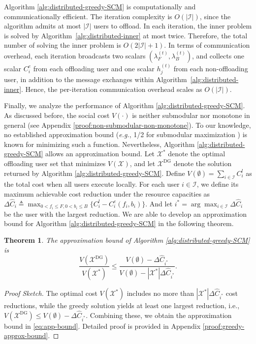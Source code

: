 \documentclass[lettersize,journal]{IEEEtran}
\newtheorem{theorem}{Theorem}
\newcommand{\eg}{\emph{e.g.}}
\begin{document}
Algorithm \ref{alg:distributed-greedy-SCM} is computationally and communicationally efficient. The iteration complexity is $O(|\mathcal{I}|)$, since the algorithm admits at most $|\mathcal{I}|$ users to offload. 
In each iteration, the inner problem is solved by Algorithm~\ref{alg:distributed-inner} at most twice. Therefore, the total number of solving the inner problem is $O(2|\mathcal{I|}+1)$.
In terms of communication overhead, each iteration broadcasts two scalars $(\lambda_F^{(t)},\lambda_B^{(t)})$, and collects one scalar $C^e_i$ from each offloading user and one scalar $h_j^{(t)}$ from each non-offloading user, in addition to the message exchanges within Algorithm~\ref{alg:distributed-inner}. Hence, the per-iteration communication overhead scales as $O(|\mathcal{I}|)$.

Finally, we analyze the performance of Algorithm \ref{alg:distributed-greedy-SCM}. As discussed before, the social cost $V(\cdot)$ is neither submodular nor monotone in general (see Appendix \ref{proof:non-submodular-non-monotone}). To our knowledge, no established approximation bound (\eg, 1/2 for submodular maximization \cite{buchbinder2018deterministic}) is known for minimizing such a function. Nevertheless, Algorithm \ref{alg:distributed-greedy-SCM} allows an approximation bound.
Let \( \mathcal{X}^* \) denote the optimal offloading user set that minimizes \( V(\mathcal{X}) \), and let \( \mathcal{X}^{\mathrm{DG}} \) denote the solution returned by Algorithm \ref{alg:distributed-greedy-SCM}. Define \( V(\emptyset) = \sum_{i \in \mathcal{I}} C_i^l \) as the total cost when all users execute locally.  
For each user \( i \in \mathcal{I} \), we define its maximum achievable cost reduction under the resource capacities as $\Delta\hat{C}_i\triangleq\max_{0<f_i\le F,0<b_i\le B}\{C^l_i-C^e_i(f_i,b_i)\}$. And let \( i^* = \arg\max_{i \in \mathcal{I}} \Delta \hat{C}_i \) be the user with the largest reduction. We are able to develop an approximation bound for Algorithm \ref{alg:distributed-greedy-SCM} in the following theorem.

\begin{theorem}\label{theorem:approx-bound}
    The approximation bound of Algorithm \ref{alg:distributed-greedy-SCM} is 
    \begin{equation}\label{eq:app-bound}
                \frac{V(\mathcal{X}^{\mathrm{DG}})}{V(\mathcal{X}^*)} \le \frac{V(\emptyset) - \Delta \hat{C}_{i^*}}{V(\emptyset) - |\mathcal{X}^*|\Delta \hat{C}_{i^*}}.
    \end{equation}
\end{theorem}
\begin{proof}[Proof Sketch]
The optimal cost \( V(\mathcal{X}^*) \) includes no more than \( |\mathcal{X}^*|\Delta \hat{C}_{i^*} \) cost reductions, while the greedy solution yields at least one largest reduction, i.e., \( V(\mathcal{X}^{\mathrm{DG}}) \le V(\emptyset) - \Delta \hat{C}_{i^*} \). Combining these, we obtain the approximation bound in \eqref{eq:app-bound}. Detailed proof is provided in Appendix \ref{proof:greedy-approx-bound}.
\end{proof}
\end{document}
